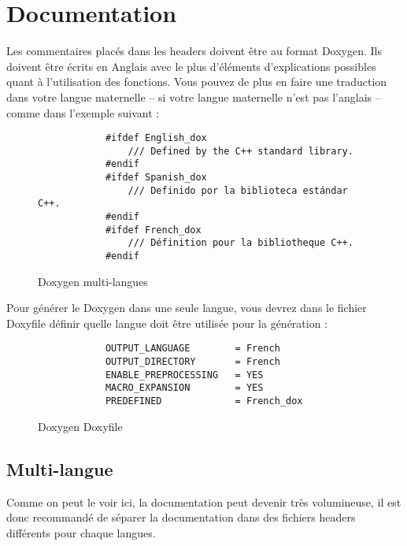 \section{Documentation}
	Les commentaires placés dans les headers doivent être au format Doxygen. Ils doivent être écrits en Anglais avec le plus d'éléments d'explications possibles quant à l'utilisation des fonctions. Vous pouvez de plus en faire une traduction dans votre langue maternelle -- si votre langue maternelle n'est pas l'anglais -- comme dans l'exemple suivant :

	\begin{figure}[H]
		\begin{changemargin}{-2.5cm}{-2.5cm}
		\begin{tcolorbox}
		\begin{verbatim}
			#ifdef English_dox 
			    /// Defined by the C++ standard library. 
			#endif
			#ifdef Spanish_dox
			    /// Definido por la biblioteca estándar C++. 
			#endif
			#ifdef French_dox
			    /// Définition pour la bibliotheque C++. 
			#endif
		\end{verbatim}
		\end{tcolorbox}
		\end{changemargin}
		\caption{Doxygen multi-langues}
	\end{figure}

	Pour générer le Doxygen dans une seule langue, vous devrez dans le fichier Doxyfile définir quelle langue doit être utilisée pour la génération :

	\begin{figure}[H]
		\begin{changemargin}{-2.5cm}{-2.5cm}
		\begin{tcolorbox}
		\begin{verbatim}
			OUTPUT_LANGUAGE        = French
			OUTPUT_DIRECTORY       = French
			ENABLE_PREPROCESSING   = YES
			MACRO_EXPANSION        = YES
			PREDEFINED             = French_dox
		\end{verbatim}
		\end{tcolorbox}
		\end{changemargin}
		\caption{Doxygen Doxyfile}
	\end{figure}

	\subsection{Multi-langue}

		Comme on peut le voir ici, la documentation peut devenir très volumineuse, il est donc recommandé de séparer la documentation dans des fichiers headers différents pour chaque langues.

